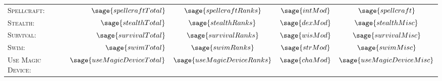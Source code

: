 \documentclass[10pt]{article}
\begin{document}
\begin{tabular}{l r c c c}
		\textsc{Spellcraft:} & \(\sage{spellcraftTotal}\) & \(\sage{spellcraftRanks}\) & \(\sage{intMod}\) & \(\sage{spellcraft}\) \\
		\textsc{Stealth:} & \(\sage{stealthTotal}\) & \(\sage{stealthRanks}\) & \(\sage{dexMod}\) & \(\sage{stealthMisc}\) \\
		\textsc{Survival:} & \(\sage{survivalTotal}\) & \(\sage{survivalRanks}\) & \(\sage{wisMod}\) & \(\sage{survivalMisc}\) \\
		\textsc{Swim:} & \(\sage{swimTotal}\) & \(\sage{swimRanks}\) & \(\sage{strMod}\) & \(\sage{swimMisc}\) \\
		\textsc{Use Magic Device:} & \(\sage{useMagicDeviceTotal}\) & \(\sage{useMagicDeviceRanks}\) & \(\sage{chaMod}\) & \(\sage{useMagicDeviceMisc}\) \\
	\end{tabular}
\end{document}
